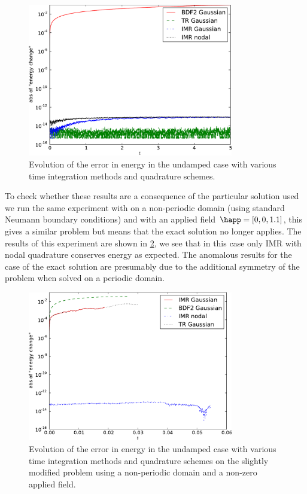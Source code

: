 \begin{figure}
  \centering
  \includegraphics[width=0.8\textwidth]{plots/2d_wave_solution_energy/absofenergychangevstimes}
  \caption{Evolution of the error in energy in the undamped case with various time integration methods and quadrature schemes.}
  \label{fig:energy-error-2d}
\end{figure}

To check whether these results are a consequence of the particular solution used we run the same experiment with on a non-periodic domain (\ie using standard Neumann boundary conditions) and with an applied field $\happ = [0, 0, 1.1]$, this gives a similar problem but means that the exact solution no longer applies.
The results of this experiment are shown in \cref{fig:energy-error-2d-happ}, we see that in this case only IMR with nodal quadrature conserves energy as expected.
The anomalous results for the case of the exact solution are presumably due to the additional symmetry of the problem when solved on a periodic domain.

\begin{figure}
  \centering
  \includegraphics[width=0.8\textwidth]{plots/2d_wave_solution_nonperiodic/absofenergychangevstimes}
  \caption{Evolution of the error in energy in the undamped case with various time integration methods and quadrature schemes on the slightly modified problem using a non-periodic domain and a non-zero applied field.}
  \label{fig:energy-error-2d-happ}
\end{figure}


